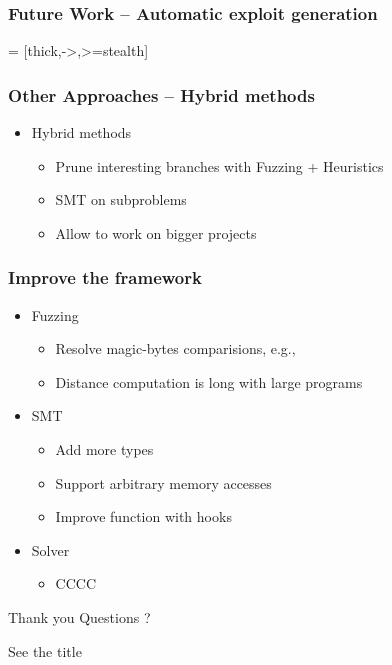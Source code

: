 \documentclass{beamer}
\begin{document}
\begin{frame}
\frametitle{Future Work -- Automatic exploit generation}
 = [thick,->,>=stealth]

\end{frame}
\begin{frame}
	\frametitle{Other Approaches -- Hybrid methods}
	\begin{itemize}
		\item Hybrid methods
		\begin{itemize}
			\item Prune interesting branches with Fuzzing + Heuristics
			\item SMT on subproblems
			\item Allow to work on bigger projects
		\end{itemize}
	\end{itemize}
\end{frame}

\begin{frame}
\frametitle{Improve the framework}
\begin{itemize}
	\item Fuzzing
	\begin{itemize}
		\item Resolve magic-bytes comparisions, e.g., 
		\item Distance computation is long with large programs
	\end{itemize}
\item SMT
\begin{itemize}
	\item Add more types
	\item Support arbitrary memory accesses
	\item Improve function with hooks	
\end{itemize}
\item Solver
\begin{itemize}
	\item CCCC
\end{itemize}
\end{itemize}
\end{frame}
\begin{frame}{Thank you Questions ?}

See the title

\end{frame}
\end{document}
